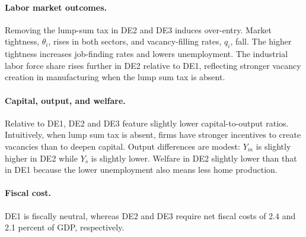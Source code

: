 \documentclass[12pt]{article} %
\theoremstyle{definition}
\begin{document}
\paragraph{Labor market outcomes.} Removing the lump-sum tax in DE2 and DE3 induces over-entry. Market tightness, $\theta_i$, rises in both sectors, and vacancy-filling rates, $q_i$, fall. The higher tightness increases job-finding rates and lowers unemployment. The industrial labor force share rises further in DE2 relative to DE1, reflecting stronger vacancy creation in manufacturing when  the lump sum tax is absent. 

\paragraph{Capital, output, and welfare.} Relative to DE1, DE2 and DE3 feature  slightly lower capital-to-output ratios. Intuitively, when lump sum tax is absent, firms have stronger incentives to create vacancies than to deepen capital. Output differences are modest: $Y_m$ is slightly higher in DE2 while $Y_s$ is slightly lower. %
Welfare in DE2 slightly lower than that in DE1 because the lower unemployment  also means less home production.

\paragraph{Fiscal cost.} DE1 is fiscally neutral, whereas DE2 and DE3 require net fiscal costs of 2.4 and 2.1 percent of GDP, respectively. 
\end{document}
